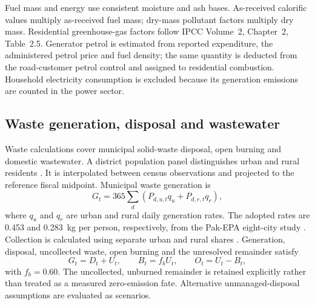 \documentclass[essd]{copernicus}
\begin{document}
Fuel mass and energy use consistent moisture and ash bases. As-received calorific values multiply as-received fuel mass; dry-mass pollutant factors multiply dry mass. Residential greenhouse-gas factors follow IPCC Volume~2, Chapter~2, Table~2.5. Generator petrol is estimated from reported expenditure, the administered petrol price and fuel density; the same quantity is deducted from the road-customer petrol control and assigned to residential combustion. Household electricity consumption is excluded because its generation emissions are counted in the power sector.

\subsection{Waste generation, disposal and wastewater}
\label{sec:waste_methods}

Waste calculations cover municipal solid-waste disposal, open burning and domestic wastewater. A district population panel distinguishes urban and rural residents \citep{PBSCensus2023}. It is interpolated between census observations and projected to the reference fiscal midpoint. Municipal waste generation is
\begin{equation}
 G_t=365\sum_d\left(P_{d,u,t}q_u+P_{d,r,t}q_r\right),
 \label{eq:waste_generation}
\end{equation}
where $q_u$ and $q_r$ are urban and rural daily generation rates. The adopted rates are 0.453 and 0.283~kg per person, respectively, from the Pak-EPA eight-city study \citep{PakEPA1996}. Collection is calculated using separate urban and rural shares \citep{Kaza2018}. Generation, disposal, uncollected waste, open burning and the unresolved remainder satisfy
\begin{equation}
 G_t=D_t+U_t,\qquad B_t=f_bU_t,\qquad O_t=U_t-B_t,
 \label{eq:waste_fates}
\end{equation}
with $f_b=0.60$. The uncollected, unburned remainder is retained explicitly rather than treated as a measured zero-emission fate. Alternative unmanaged-disposal assumptions are evaluated as scenarios.
\end{document}
